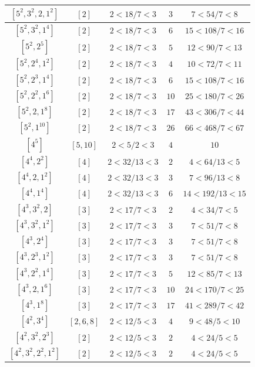 \documentclass{article}%
\begin{document}
\begin{center}
\begin{longtable}{||c|c|c|c|c||}
$[5^{2}, 3^{2}, 2, 1^{2}]$ & $[2]$ & $2 < 18/7 < 3$ & $3$ & $7 < 54/7 < 8$ \\ \hline 
$[5^{2}, 3^{2}, 1^{4}]$ & $[2]$ & $2 < 18/7 < 3$ & $6$ & $15 < 108/7 < 16$ \\ \hline 
$[5^{2}, 2^{5}]$ & $[2]$ & $2 < 18/7 < 3$ & $5$ & $12 < 90/7 < 13$ \\ \hline 
$[5^{2}, 2^{4}, 1^{2}]$ & $[2]$ & $2 < 18/7 < 3$ & $4$ & $10 < 72/7 < 11$ \\ \hline 
$[5^{2}, 2^{3}, 1^{4}]$ & $[2]$ & $2 < 18/7 < 3$ & $6$ & $15 < 108/7 < 16$ \\ \hline 
$[5^{2}, 2^{2}, 1^{6}]$ & $[2]$ & $2 < 18/7 < 3$ & $10$ & $25 < 180/7 < 26$ \\ \hline 
$[5^{2}, 2, 1^{8}]$ & $[2]$ & $2 < 18/7 < 3$ & $17$ & $43 < 306/7 < 44$ \\ \hline 
$[5^{2}, 1^{10}]$ & $[2]$ & $2 < 18/7 < 3$ & $26$ & $66 < 468/7 < 67$ \\ \hline 
$[4^{5}]$ & $[5, 10]$ & $2 < 5/2 < 3$ & $4$ & $10$ \\ \hline 
$[4^{4}, 2^{2}]$ & $[4]$ & $2 < 32/13 < 3$ & $2$ & $4 < 64/13 < 5$ \\ \hline 
$[4^{4}, 2, 1^{2}]$ & $[4]$ & $2 < 32/13 < 3$ & $3$ & $7 < 96/13 < 8$ \\ \hline 
$[4^{4}, 1^{4}]$ & $[4]$ & $2 < 32/13 < 3$ & $6$ & $14 < 192/13 < 15$ \\ \hline 
$[4^{3}, 3^{2}, 2]$ & $[3]$ & $2 < 17/7 < 3$ & $2$ & $4 < 34/7 < 5$ \\ \hline 
$[4^{3}, 3^{2}, 1^{2}]$ & $[3]$ & $2 < 17/7 < 3$ & $3$ & $7 < 51/7 < 8$ \\ \hline 
$[4^{3}, 2^{4}]$ & $[3]$ & $2 < 17/7 < 3$ & $3$ & $7 < 51/7 < 8$ \\ \hline 
$[4^{3}, 2^{3}, 1^{2}]$ & $[3]$ & $2 < 17/7 < 3$ & $3$ & $7 < 51/7 < 8$ \\ \hline 
$[4^{3}, 2^{2}, 1^{4}]$ & $[3]$ & $2 < 17/7 < 3$ & $5$ & $12 < 85/7 < 13$ \\ \hline 
$[4^{3}, 2, 1^{6}]$ & $[3]$ & $2 < 17/7 < 3$ & $10$ & $24 < 170/7 < 25$ \\ \hline 
$[4^{3}, 1^{8}]$ & $[3]$ & $2 < 17/7 < 3$ & $17$ & $41 < 289/7 < 42$ \\ \hline 
$[4^{2}, 3^{4}]$ & $[2, 6, 8]$ & $2 < 12/5 < 3$ & $4$ & $9 < 48/5 < 10$ \\ \hline 
$[4^{2}, 3^{2}, 2^{3}]$ & $[2]$ & $2 < 12/5 < 3$ & $2$ & $4 < 24/5 < 5$ \\ \hline 
$[4^{2}, 3^{2}, 2^{2}, 1^{2}]$ & $[2]$ & $2 < 12/5 < 3$ & $2$ & $4 < 24/5 < 5$ \\ \hline 

\end{longtable}
\end{center}
\end{document}
